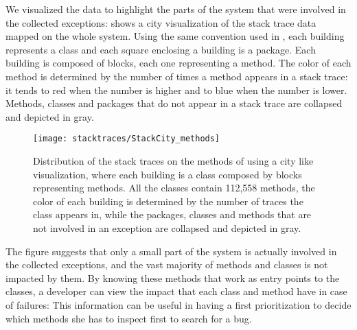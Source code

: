 We visualized the data to highlight the parts of the \pha system that were involved in the collected exceptions:  shows a city visualization of the stack trace data mapped on the whole \pha system.
Using the same convention used in , each building represents a class and each square enclosing a building is a package.
Each building is composed of blocks, each one representing a method.
The color of each method is determined by the number of times a method appears in a stack trace: it tends to red when the number is higher and to blue when the number is lower.
Methods, classes and packages that do not appear in a stack trace are collapsed and depicted in gray.

\begin{figure}[ht]
\centering
\texttt{[image: stacktraces/StackCity\_methods]}
\caption[Distribution of the stack traces on the methods of \pha using a city like visualization]{Distribution of the stack traces on the methods of \pha using a city like visualization, where each building is a class composed by blocks representing methods.
All the classes contain 112,558 methods, the color of each building is determined by the number of traces the class appears in, while the packages, classes and methods that are not involved in an exception are collapsed and depicted in gray.}
  \label{fig:stackcity-methods}
\end{figure}

The figure suggests that only a small part of the system is actually involved in the collected exceptions, and the vast majority of methods and classes is not impacted by them.
By knowing these methods that work as entry points to the classes, a developer can view the impact that each class and method have in case of failures: This information can be useful in having a first prioritization to decide which methods she has to inspect first to search for a bug.

